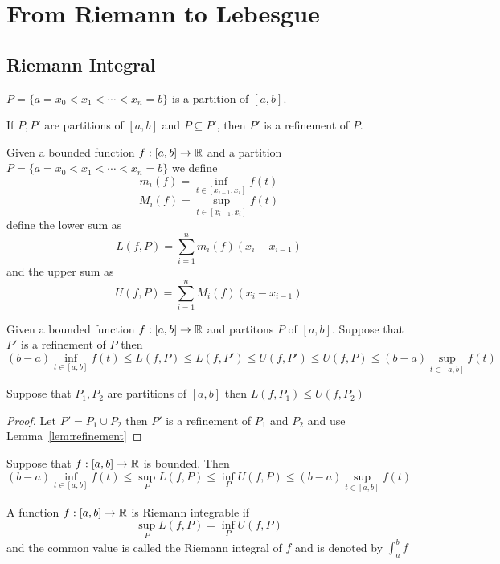 \chapter{From Riemann to Lebesgue}

\section{Riemann Integral}

\begin{definition}
  $P = \{a = x_0 < x_1 < \cdots < x_n = b\}$ is a partition of $[a,b]$. 
\end{definition}
\begin{definition}
  If $P, P'$ are partitions of $[a, b]$ and $P \subseteq P'$, then $P'$ is a refinement of $P$. 
\end{definition}

\begin{definition}
  Given a bounded function $f: [a, b] \to \mathbb R$ and a partition $P = \{a = x_0 < x_1 < \cdots < x_n = b\}$
  we define
  \[ m_i(f) = \inf_{t\in[x_{i-1}, x_i]}f(t)\] 
  \[ M_i(f) = \sup_{t\in[x_{i-1}, x_i]}f(t)\] 
  define the lower sum as
  \[L(f, P) = \sum_{i=1}^{n} m_i(f)(x_i - x_{i-1})\]
  and the upper sum as
  \[U(f, P) = \sum_{i=1}^{n} M_i(f)(x_i - x_{i-1})\]
\end{definition}

\begin{lemma}\label{lem:refinement}
  Given a bounded function $f: [a, b] \to \mathbb R$ and
  partitons $P$ of $[a, b]$. Suppose that $P'$ is a refinement of $P$ then
  \[(b-a)\inf_{t\in[a, b]}f(t)\le L(f, P) \le L(f, P') \le U(f, P') \le U(f, P) \le (b-a)\sup_{t\in[a, b]}f(t)\] 
\end{lemma}

\begin{corollary}
  Suppose that $P_1, P_2$ are partitions of $[a, b]$ then $L(f, P_1) \le U(f, P_2)$
\end{corollary}
\begin{proof}
  Let $P' = P_1 \cup P_2$ then $P'$ is a refinement of $P_1$ and $P_2$ and use Lemma~\ref{lem:refinement}
\end{proof}

\begin{lemma}
  Suppose that $f: [a, b] \to \mathbb R$ is bounded. Then
  \[(b-a)\inf_{t\in[a, b]}f(t) \leq \sup_{P}L(f, P) \leq \inf_{P}U(f, P) \leq(b-a)\sup_{t\in[a, b]}f(t)\]
\end{lemma}

\begin{definition}
  A function $f: [a, b] \to \mathbb R$ is Riemann integrable if
  \[\sup_{P}L(f, P) = \inf_{P}U(f, P)\]
  and the common value is called the Riemann integral of $f$ and is denoted by $\int_a^b f$
\end{definition}

